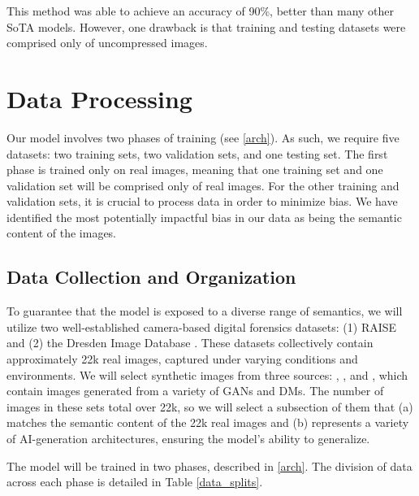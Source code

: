 \documentclass{article} %
\begin{document}
This method was able to achieve an accuracy of 90\%, better than many other SoTA models. However, one drawback is that training and testing datasets were comprised only of uncompressed images.

\section{Data Processing}
\label{data}
Our model involves two phases of training (see \ref{arch}). As such, we require five datasets: two training sets, two validation sets, and one testing set. The first phase is trained only on real images, meaning that one training set and one validation set will be comprised only of real images. For the other training and validation sets, it is crucial to process data in order to minimize bias. We have identified the most potentially impactful bias in our data as being the semantic content of the images.

\subsection{Data Collection and Organization}
\label{data_coll}
To guarantee that the model is exposed to a diverse range of semantics, we will utilize two well-established camera-based digital forensics datasets: (1) RAISE \citep{10.1145/2713168.2713194} and (2) the Dresden Image Database \citep{10.1145/1774088.1774427}. These datasets collectively contain approximately 22k real images, captured under varying conditions and environments. We will select synthetic images from three sources: \citet{wang2020cnngeneratedimagessurprisinglyeasy}, \citet{corvi2022detectionsyntheticimagesgenerated}, and \citet{ojha2024universalfakeimagedetectors}, which contain images generated from a variety of GANs and DMs. The number of images in these sets total over 22k, so we will select a subsection of them that (a) matches the semantic content of the 22k real images and (b) represents a variety of AI-generation architectures, ensuring the model's ability to generalize.

The model will be trained in two phases, described in \ref{arch}. The division of data across each phase is detailed in Table \ref{data_splits}.
\end{document}

